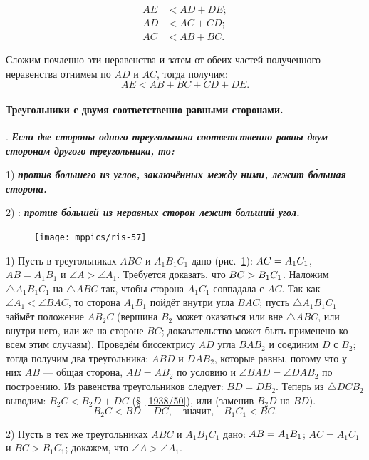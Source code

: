 \documentclass[oneside]{book}
\begin{document}
\begin{align*}
AE&<AD+DE;
\\
AD&<AC +CD;
\\
AC&<AB+BC.
\end{align*}

Сложим почленно эти неравенства и затем от обеих частей полученного неравенства отнимем по $AD$ и $AC$, тогда получим:
\[AE<AB+BC +CD + DE.\]

\paragraph{Треугольники с двумя соответственно равными сторонами.}\label{1938/52}

.
\textbf{\emph{Если две стороны одного треугольника соответственно равны двум сторонам другого треугольника, то:}}

1) \textbf{\emph{против большего из углов, заключённых между ними, лежит б\'{о}льшая сторона.}}

2) :
\textbf{\emph{против б\'{о}льшей из неравных сторон лежит больший угол.}}

\begin{figure}[h!]
\centering
\texttt{[image: mppics/ris-57]}
\caption{}\label{1938/ris-57}
\end{figure}

1) Пусть в треугольниках $ABC$ и $A_1B_1C_1$ дано (рис.~\ref{1938/ris-57}):
$AC\z=A_1C_1$, $AB=A_1B_1$ и $\angle A > \angle A_1$.
Требуется доказать, что $BC\z>B_1C_1$.
Наложим $\triangle A_1B_1C_1$ на $\triangle ABC$ так, чтобы сторона $A_1C_1$ совпадала с $AC$.
Так как $\angle A_1 < \angle BAC$, то сторона $A_1B_1$ пойдёт внутри угла $BAC$;
пусть $\triangle A_1B_1C_1$ займёт положение $AB_2C$ (вершина $B_2$ может оказаться или вне $\triangle ABC$, или внутри него, или же на стороне $BC$;
доказательство может быть применено ко всем этим случаям).
Проведём биссектрису $AD$ угла $BAB_2$ и соединим $D$ с $B_2$;
тогда получим два треугольника:
$ABD$ и $DAB_2$, которые равны, потому что у них $AB$ — общая сторона, $AB=AB_2$ по условию и $\angle BAD=\angle DAB_2$ по построению.
Из равенства треугольников следует:
$BD=DB_2$.
Теперь из $\triangle DCB_2$ выводим:
$B_2C < B_2D + DC$ (§~\ref{1938/50}), или (заменив $B_2D$ на $BD$).
\[B_2C <BD +DC,\quad\text{значит,}\quad B_1C_1 < BC.\]

2) Пусть в тех же треугольниках $ABC$ и $A_1B_1C_1$ дано:
$AB\z=A_1B_1$;
$AC=A_1C_1$ и $BC>B_1C_1$;
докажем, что $\angle A > \angle A_1$.
\end{document}
